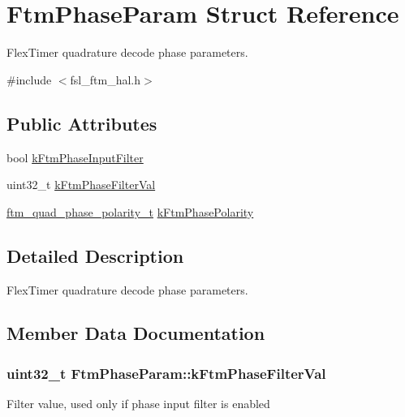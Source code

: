 \hypertarget{structFtmPhaseParam}{}\section{Ftm\+Phase\+Param Struct Reference}
\label{structFtmPhaseParam}


Flex\+Timer quadrature decode phase parameters.  




{\ttfamily \#include $<$fsl\+\_\+ftm\+\_\+hal.\+h$>$}

\subsection*{Public Attributes}
\begin{DoxyCompactItemize}
\item 
bool \hyperlink{structFtmPhaseParam_a4dbd9e4f63b8d40055aa1c0348df1d11}{k\+Ftm\+Phase\+Input\+Filter}
\item 
uint32\+\_\+t \hyperlink{structFtmPhaseParam_ad9a652685573eab4cef27bd1a0db4ad3}{k\+Ftm\+Phase\+Filter\+Val}
\item 
\hyperlink{group__ftm__hal_ga0b71d5e8e498700f6aabc56a5bd5f00d}{ftm\+\_\+quad\+\_\+phase\+\_\+polarity\+\_\+t} \hyperlink{structFtmPhaseParam_a3b51ac5a871a3ab51f3e9071288394df}{k\+Ftm\+Phase\+Polarity}
\end{DoxyCompactItemize}


\subsection{Detailed Description}
Flex\+Timer quadrature decode phase parameters. 

\subsection{Member Data Documentation}
\subsubsection[{\texorpdfstring{k\+Ftm\+Phase\+Filter\+Val}{kFtmPhaseFilterVal}}]{\setlength{\rightskip}{0pt plus 5cm}uint32\+\_\+t Ftm\+Phase\+Param\+::k\+Ftm\+Phase\+Filter\+Val}\hypertarget{structFtmPhaseParam_ad9a652685573eab4cef27bd1a0db4ad3}{}\label{structFtmPhaseParam_ad9a652685573eab4cef27bd1a0db4ad3}
Filter value, used only if phase input filter is enabled 
